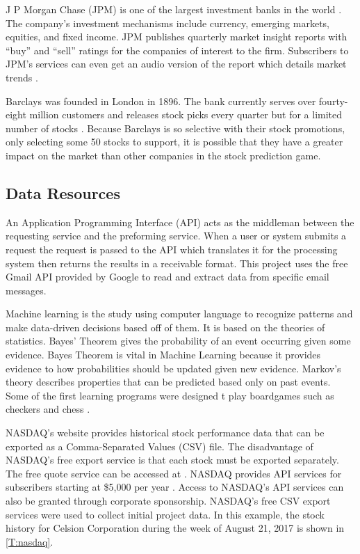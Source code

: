 \documentclass[sigconf]{acmart}
\begin{document}
J P Morgan Chase (JPM) is one of the largest investment banks in the world \cite{www-investBanks}. The company's investment mechanisms include currency, emerging markets, equities, and fixed income. JPM publishes quarterly market insight reports with ``buy'' and ``sell'' ratings for the companies of interest to the firm. Subscribers to JPM's services can even get an audio version of the report which details market trends \cite{www-JPM}.

Barclays was founded in London in 1896. The bank currently serves over fourty-eight million customers and releases stock picks every quarter but for a limited number of stocks \cite{www-investBanks}. Because Barclays is so selective with their stock promotions, only selecting some 50 stocks to support, it is possible that they have a greater impact on the market than other companies in the stock prediction game. 

\subsection{Data Resources}
An Application Programming Interface (API) acts as the middleman between the requesting service and the preforming service. When a user or system submits a request the request is passed to the API which translates it for the processing system then returns the results in a receivable format. This project uses the free Gmail API provided by Google to read and extract data from specific email messages.

Machine learning is the study using computer language to recognize patterns and make data-driven decisions based off of them. It is based on the theories of statistics. Bayes' Theorem gives the probability of an event occurring given some evidence. Bayes Theorem is vital in Machine Learning because it provides evidence to how probabilities should be updated given new evidence. Markov's theory describes properties that can be predicted based only on past events. Some of the first learning programs were designed t play boardgames such as checkers and chess \cite{www-wikiMachine}.

NASDAQ's website provides historical stock performance data that can be exported as a Comma-Separated Values (CSV) file. The disadvantage of NASDAQ's free export service is that each stock must be exported separately. The free quote service can be accessed at \cite{www-quotenasdaq}. NASDAQ provides API services for subscribers starting at \$5,000 per year \cite{www-nasdaq-sub}. Access to NASDAQ's API services can also be granted through corporate sponsorship. NASDAQ's free CSV export services were used to collect initial project data. In this example, the stock history for Celsion Corporation during the week of August 21, 2017 is shown  in \ref{T:nasdaq}.
\end{document}

